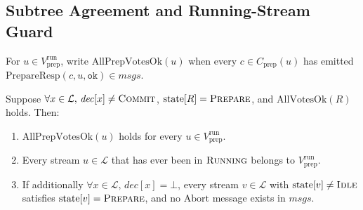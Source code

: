 \documentclass[sigconf,nonacm]{acmart}
\newcommand{\stIdle}{\textsc{Idle}}
\newcommand{\stRun}{\textsc{Running}}
\newcommand{\stPrep}{\textsc{Prepare}}
\newcommand{\stCom}{\textsc{Commit}}
\newcommand{\dec}{\mathit{dec}}
\begin{document}
\subsection{Subtree Agreement and Running-Stream Guard}
\label{sec:guard}
For \(u \in V_{\mathrm{prep}}^{\mathrm{run}}\), write
\(\mathrm{AllPrepVotesOk}(u)\) when every \(c \in C_{\mathrm{prep}}(u)\) has
emitted \(\mathrm{PrepareResp}(c, u, \mathtt{ok}) \in \mathit{msgs}\).

\begin{lemma}\label{lem:guard}
Suppose \(\forall x \in \mathcal{L},\, \dec[x] \neq \stCom\),
\(\mathrm{state}[R] = \stPrep\), and \(\mathrm{AllVotesOk}(R)\) holds. Then:
\begin{enumerate}
  \item[\emph{(a)}] \(\mathrm{AllPrepVotesOk}(u)\) holds for every
    \(u \in V_{\mathrm{prep}}^{\mathrm{run}}\).
  \item[\emph{(b)}] Every stream \(u \in \mathcal{L}\) that has ever been in
    \(\stRun\) belongs to \(V_{\mathrm{prep}}^{\mathrm{run}}\).
  \item[\emph{(c)}] If additionally \(\forall x \in \mathcal{L},\, \dec[x] =
    \bot\), every stream \(v \in \mathcal{L}\) with \(\mathrm{state}[v] \neq
    \stIdle\) satisfies \(\mathrm{state}[v] = \stPrep\), and no
    \(\mathrm{Abort}\) message exists in \(\mathit{msgs}\).
\end{enumerate}
\end{lemma}
\end{document}
